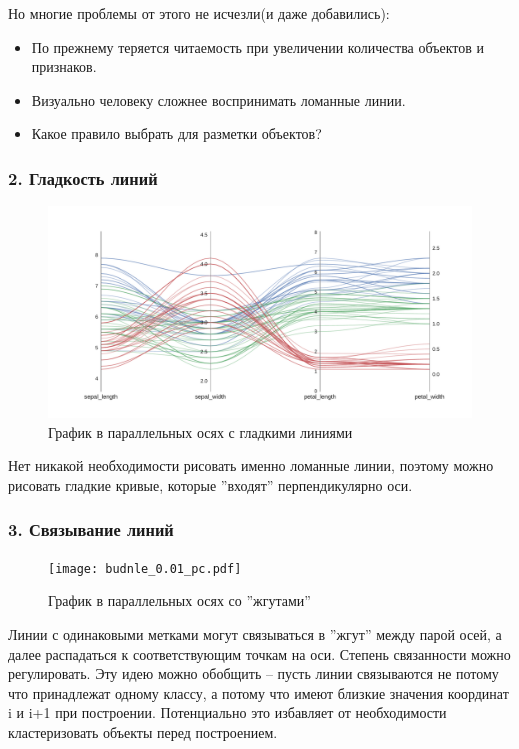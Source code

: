 \documentclass[12pt,fleqn]{article}
\begin{document}
Но многие проблемы от этого не исчезли(и даже добавились):
\begin{itemize}
    \item По прежнему теряется читаемость при увеличении количества объектов и признаков.
    \item Визуально человеку сложнее воспринимать ломанные линии.
    \item Какое правило выбрать для разметки объектов?
\end{itemize}

\subsubsection{2. Гладкость линий}

\begin{figure}[htb]
    \centering
    \includegraphics[width=15cm]{smooth_pc.pdf}
    \caption{График в параллельных осях с гладкими линиями}
    \label{smooth_pc}
\end{figure}

Нет никакой необходимости рисовать именно ломанные линии, поэтому можно рисовать гладкие кривые, 
которые ''входят'' перпендикулярно оси.

\subsubsection{3. Связывание линий}

\begin{figure}[htb]
    \centering
    \texttt{[image: budnle\_0.01\_pc.pdf]}
    \caption{График в параллельных осях со ''жгутами''}
    \label{bundle0.01_pc}
\end{figure}

Линии с одинаковыми метками могут связываться в ''жгут'' между парой осей, а 
далее распадаться к соответствующим точкам на оси. Степень связанности можно регулировать.
Эту идею можно обобщить -- пусть линии связываются не потому что принадлежат одному классу, 
а потому что имеют близкие значения координат i и i+1 при построении. Потенциально это избавляет
от необходимости кластеризовать объекты перед построением.
\end{document}

